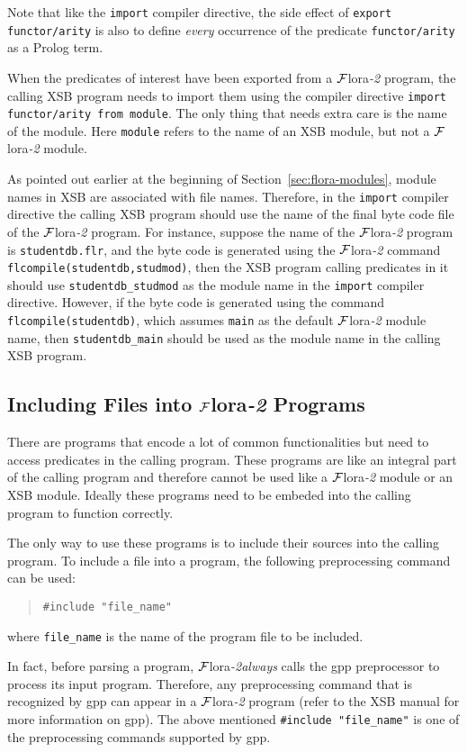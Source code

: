 \documentclass[11pt]{article}
\newcommand{\FLORA}{{\mbox{${\cal F}${\sc lora}\rm\emph{-2}}}\xspace}
\begin{document}
Note that like the {\tt import} compiler directive, the side effect
of {\tt export functor/arity} is also to define \emph{every} occurrence
of the predicate {\tt functor/arity} as a Prolog term.

When the predicates of interest have been exported from a \FLORA
program, the calling XSB program needs to import them using the
compiler directive \mbox{\tt import functor/arity from module}.
The only thing that needs extra care is the name of the module.
Here {\tt module} refers to the name of an XSB module, but not
a \FLORA module.

%
As pointed out earlier at the beginning of
Section~\ref{sec:flora-modules}, module names in XSB are associated
with file names. Therefore, in the {\tt import} compiler directive the
calling XSB program should use the name of the final byte code file of
the \FLORA program. For instance, suppose the name of the \FLORA
program is {\tt studentdb.flr}, and the byte code is generated using
the \FLORA command {\tt flcompile(studentdb,studmod)}, then the XSB
program calling predicates in it should use \verb|studentdb_studmod|
as the module name in the {\tt import} compiler directive. However, if
the byte code is generated using the command {\tt flcompile(studentdb)},
which assumes {\tt main} as the default \FLORA module name, then
\verb|studentdb_main| should be used as the module name in the calling
XSB program.


\subsection{Including Files into \FLORA Programs}


There are programs that encode a lot of common functionalities but
need to access predicates in the calling program. These programs are
like an integral part of the calling program and therefore cannot be
used like a \FLORA module or an XSB module. Ideally these programs
need to be embeded into the calling program to function correctly.

%
The only way to use these programs is to include their sources into
the calling program. To include a file into a program, the following
preprocessing command can be used:
\begin{quote}
\verb|#include "file_name"|
\end{quote}
where \verb|file_name| is the name of the program file to be included.

In fact, before parsing a program, \FLORA \emph{always} calls the
{\sf gpp} preprocessor to process its input program. Therefore, any
preprocessing command that is recognized by {\sf gpp} can appear in
a \FLORA program (refer to the XSB manual for more information on
{\sf gpp}). The above mentioned \verb|#include "file_name"| is one
of the preprocessing commands supported by {\sf gpp}.
\end{document}
